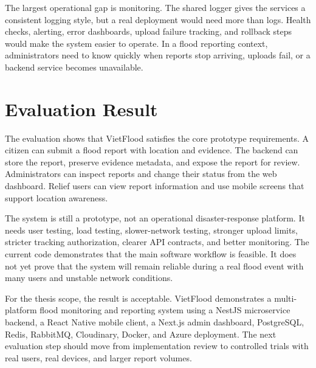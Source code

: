 The largest operational gap is monitoring. The shared logger gives the services a consistent logging style, but a real deployment would need more than logs. Health checks, alerting, error dashboards, upload failure tracking, and rollback steps would make the system easier to operate. In a flood reporting context, administrators need to know quickly when reports stop arriving, uploads fail, or a backend service becomes unavailable.

\section{Evaluation Result}

The evaluation shows that VietFlood satisfies the core prototype requirements. A citizen can submit a flood report with location and evidence. The backend can store the report, preserve evidence metadata, and expose the report for review. Administrators can inspect reports and change their status from the web dashboard. Relief users can view report information and use mobile screens that support location awareness.

The system is still a prototype, not an operational disaster-response platform. It needs user testing, load testing, slower-network testing, stronger upload limits, stricter tracking authorization, clearer API contracts, and better monitoring. The current code demonstrates that the main software workflow is feasible. It does not yet prove that the system will remain reliable during a real flood event with many users and unstable network conditions.

For the thesis scope, the result is acceptable. VietFlood demonstrates a multi-platform flood monitoring and reporting system using a NestJS microservice backend, a React Native mobile client, a Next.js admin dashboard, PostgreSQL, Redis, RabbitMQ, Cloudinary, Docker, and Azure deployment. The next evaluation step should move from implementation review to controlled trials with real users, real devices, and larger report volumes.
